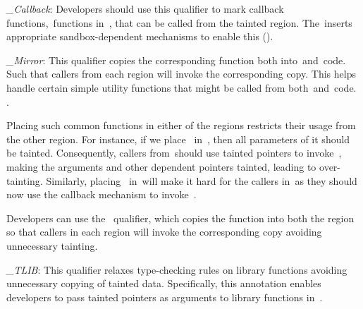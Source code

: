 \noindent\emph{\_Callback}:
Developers should use this qualifier to mark callback functions,~\ie functions in~\cregion, that can be called from the tainted region. 
The~\sourcerewriter inserts appropriate sandbox-dependent mechanisms to enable this ().

\noindent\emph{\_Mirror}: 
This qualifier copies the corresponding function both into~\cregion and~\ucregion code. Such that callers from each region will invoke the corresponding copy.
This helps handle certain simple utility functions that might be called from both~\cregion and~\ucregion code.
.

Placing such common functions in either of the regions restricts their usage from the other region. For instance, if we place~ in~\ucregion, then all parameters of it should be tainted. Consequently, callers from~\cregion should use tainted pointers to invoke~, making the arguments and other dependent pointers tainted, leading to over-tainting.
Similarly, placing~ in~\cregion will make it hard for the callers in~\ucregion as they should now use the callback mechanism to invoke~.

Developers can use the~ qualifier, which copies the function into both the region so that callers in each region will invoke the corresponding copy avoiding unnecessary tainting. 

\noindent\emph{\_TLIB}:
This qualifier relaxes type-checking rules on library functions avoiding unnecessary copying of tainted data.
Specifically, this annotation enables developers to pass tainted pointers as arguments to library functions in~\cregion.

